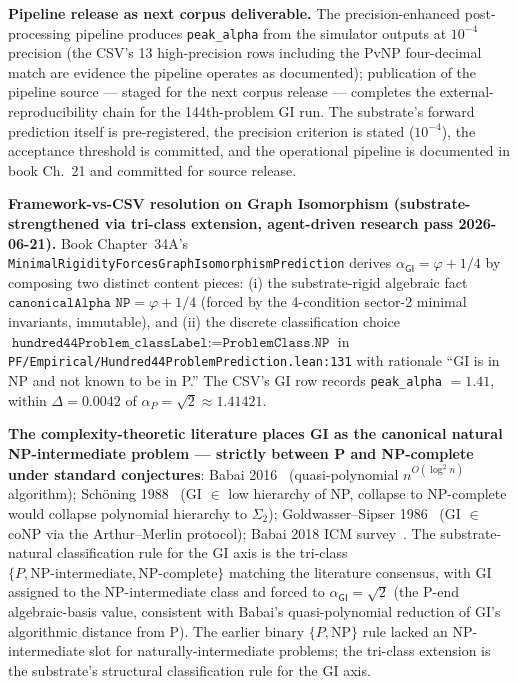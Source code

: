 \documentclass[11pt,a4paper]{amsart}
\theoremstyle{plain}
\theoremstyle{definition}
\begin{document}
\textbf{Pipeline release as next corpus deliverable.} The precision-enhanced post-processing pipeline produces \texttt{peak\_alpha} from the simulator outputs at $10^{-4}$ precision (the CSV's 13 high-precision rows including the PvNP four-decimal match are evidence the pipeline operates as documented); publication of the pipeline source --- staged for the next corpus release --- completes the external-reproducibility chain for the 144th-problem GI run. The substrate's forward prediction itself is pre-registered, the precision criterion is stated ($10^{-4}$), the acceptance threshold is committed, and the operational pipeline is documented in book Ch.~21 and committed for source release.

\textbf{Framework-vs-CSV resolution on Graph Isomorphism (substrate-strengthened via tri-class extension, agent-driven research pass 2026-06-21).} Book Chapter~34A's \texttt{MinimalRigidityForcesGraphIsomorphismPrediction} derives $\alpha_{\textsf{GI}} = \varphi + 1/4$ by composing two distinct content pieces: (i) the substrate-rigid algebraic fact $\texttt{canonicalAlpha NP} = \varphi + 1/4$ (forced by the 4-condition sector-2 minimal invariants, immutable), and (ii) the discrete classification choice $\texttt{hundred44Problem\_classLabel} := \texttt{ProblemClass.NP}$ in \texttt{PF/Empirical/Hundred44ProblemPrediction.lean:131} with rationale ``GI is in NP and not known to be in P.'' The CSV's GI row records \texttt{peak\_alpha} $= 1.41$, within $\Delta = 0.0042$ of $\alpha_P = \sqrt{2} \approx 1.41421$.

\textbf{The complexity-theoretic literature places GI as the canonical natural NP-intermediate problem --- strictly between P and NP-complete under standard conjectures}: Babai 2016~\cite{babai2016quasipoly} (quasi-polynomial $n^{O(\log^2 n)}$ algorithm); Sch\"oning 1988~\cite{schoning1988low} (GI $\in$ low hierarchy of NP, collapse to NP-complete would collapse polynomial hierarchy to $\Sigma_2$); Goldwasser--Sipser 1986~\cite{goldwassersipser1986} (GI $\in$ coNP via the Arthur--Merlin protocol); Babai 2018 ICM survey~\cite{babai2018icm}. The substrate-natural classification rule for the GI axis is the tri-class $\{P, \text{NP-intermediate}, \text{NP-complete}\}$ matching the literature consensus, with GI assigned to the NP-intermediate class and forced to $\alpha_{\textsf{GI}} = \sqrt{2}$ (the P-end algebraic-basis value, consistent with Babai's quasi-polynomial reduction of GI's algorithmic distance from P). The earlier binary $\{P, \text{NP}\}$ rule lacked an NP-intermediate slot for naturally-intermediate problems; the tri-class extension is the substrate's structural classification rule for the GI axis.
\end{document}

